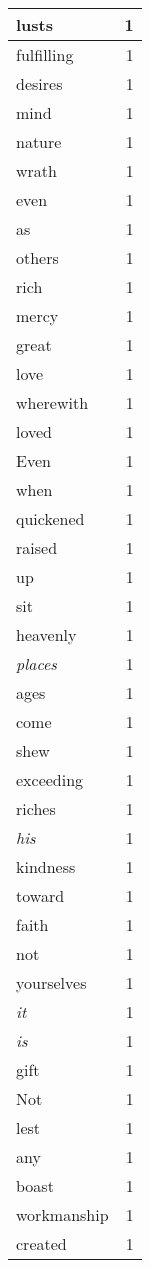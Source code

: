 \begin{center}
\begin{longtable}{l|r}
lusts & 1\\ \hline 
fulfilling & 1\\ \hline 
desires & 1\\ \hline 
mind & 1\\ \hline 
nature & 1\\ \hline 
wrath & 1\\ \hline 
even & 1\\ \hline 
as & 1\\ \hline 
others & 1\\ \hline 
rich & 1\\ \hline 
mercy & 1\\ \hline 
great & 1\\ \hline 
love & 1\\ \hline 
wherewith & 1\\ \hline 
loved & 1\\ \hline 
Even & 1\\ \hline 
when & 1\\ \hline 
quickened & 1\\ \hline 
raised & 1\\ \hline 
up & 1\\ \hline 
sit & 1\\ \hline 
heavenly & 1\\ \hline 
\emph{places} & 1\\ \hline 
ages & 1\\ \hline 
come & 1\\ \hline 
shew & 1\\ \hline 
exceeding & 1\\ \hline 
riches & 1\\ \hline 
\emph{his} & 1\\ \hline 
kindness & 1\\ \hline 
toward & 1\\ \hline 
faith & 1\\ \hline 
not & 1\\ \hline 
yourselves & 1\\ \hline 
\emph{it} & 1\\ \hline 
\emph{is} & 1\\ \hline 
gift & 1\\ \hline 
Not & 1\\ \hline 
lest & 1\\ \hline 
any & 1\\ \hline 
boast & 1\\ \hline 
workmanship & 1\\ \hline 
created & 1\\ \hline 

\end{longtable}
\end{center}

